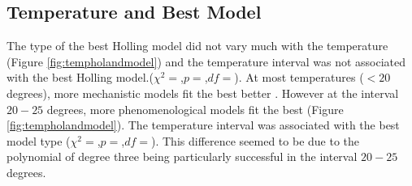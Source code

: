 \documentclass{article}
\begin{document}
\subsection{Temperature and Best Model}
The type of the best Holling model did not vary much with the temperature (Figure \ref{fig:tempholandmodel}) and the temperature interval was not associated with the best Holling model.($\chi^2=$,$p=$,$df=$). At most temperatures ($<20$ degrees), more mechanistic models fit the best better . However at the interval $20-25$ degrees, more phenomenological models fit the best (Figure \ref{fig:tempholandmodel}).  The temperature interval was associated with the best model type ($\chi^2=$,$p=$,$df=$). This difference seemed to be due to the polynomial of degree three being particularly successful in the interval $20-25$ degrees.
\end{document}
